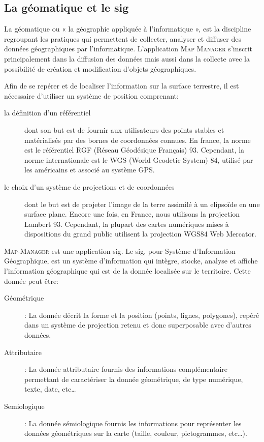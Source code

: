 \documentclass{rapportUHA40}
\begin{document}
\subsection{La géomatique et le \gls{sig}}
La géomatique ou « la géographie appliquée à l'informatique », est la
discipline regroupant les pratiques qui permettent de collecter, analyser et
diffuser des données géographiques par l'informatique. L'application
\textsc{Map Manager} s'inscrit principalement dans la diffusion des données
mais aussi dans la collecte avec la possibilité de création et modification
d'objets géographiques.

Afin de se repérer et de localiser l'information sur la surface terrestre, il
est nécessaire d'utiliser un système de position comprenant:
\begin{description}
  \item[la définition d'un référentiel] dont son but est de fournir aux utilisateurs
    des points stables et matérialisés par des bornes de coordonnées connues. En
    france, la norme est le référentiel RGF (Réseau Géodésique Français) 93.
    Cependant, la norme internationale est le WGS (World Geodetic System) 84,
    utilisé par les américains et associé au système GPS\@.

  \item[le choix d'un système de projections et de coordonnées] dont le but est de
    projeter l'image de la terre assimilé à un elipsoïde en une surface plane.
    Encore une fois, en France, nous utilisons la projection Lambert 93. Cependant,
    la plupart des cartes numériques mises à dispositions du grand public utilisent
    la projection WGS84 Web Mercator.
\end{description}


\textsc{Map-Manager} est une application \gls{sig}. Le \gls{sig}, pour Système d'Information Géographique, est un système d’information
qui intègre, stocke, analyse et affiche l'information géographique qui est de
la donnée localisée sur le territoire. Cette donnée peut être:
\begin{description}
  \item[Géométrique]: La donnée décrit la forme et la position (points, lignes,
  polygones), repéré dans un système de projection retenu et donc superposable
  avec d'autres données.
  \item[Attributaire]: La donnée attributaire fournis des informations complémentaire
  permettant de caractériser la donnée géométrique, de type numérique, texte,
  date, etc\ldots
  \item[Semiologique]: La donnée sémiologique fournis les informations pour représenter
  les données géométriques sur la carte (taille, couleur, pictogrammes,
  etc\ldots).
\end{description}
\end{document}
